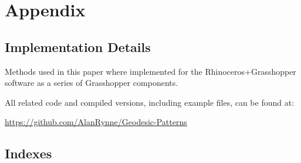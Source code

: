 \appendix{}

\section{Appendix}
 
\subsection{Implementation Details}

Methods used in this paper where implemented for the Rhinoceros+Grasshopper software as a series of Grasshopper components.

All related code and compiled versions, including example files, can be found at:

\hyperref[https://github.com/AlanRynne/Geodesic-Patterns]{https://github.com/AlanRynne/Geodesic-Patterns}

\subsection{Indexes}

\listoftables
\listofalgorithms
\listoffigures